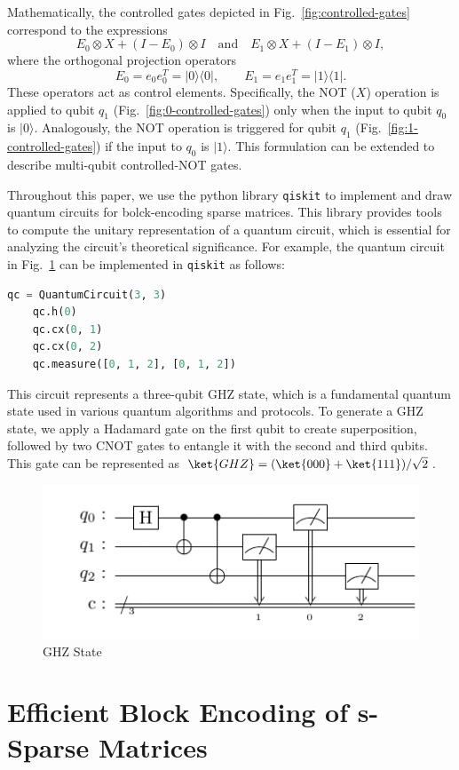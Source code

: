 \documentclass{article}
\begin{document}
    Mathematically, the controlled gates depicted in Fig.~\ref{fig:controlled-gates} correspond to the expressions
    $$
    E_0 \otimes X + (I - E_0) \otimes I \quad \text{and} \quad E_1 \otimes X + (I - E_1) \otimes I, \tag{2.3}
    $$
    where the orthogonal projection operators
    $$
    E_0 = e_0 e_0^T = |0\rangle\langle 0|, \qquad E_1 = e_1 e_1^T = |1\rangle\langle 1|. \tag{2.4}
    $$
    These operators act as control elements.
    Specifically, the NOT ($X$) operation is applied to qubit $q_1$ (Fig.~\ref{fig:0-controlled-gates}) only when the input to qubit $q_0$ is $|0\rangle$. Analogously, the NOT operation is triggered for qubit $q_1$ (Fig.~\ref{fig:1-controlled-gates}) if the input to $q_0$ is $|1\rangle$.
    This formulation can be extended to describe multi-qubit controlled-NOT gates.

    Throughout this paper, we use the python library \texttt{qiskit} \cite{wille2019ibm} to implement and draw quantum circuits for bolck-encoding sparse matrices.
    This library provides tools to compute the unitary representation of a quantum circuit, which is essential for analyzing the circuit's theoretical significance.
    For example, the quantum circuit in Fig.~\ref{fig:circuit1} can be implemented in \texttt{qiskit} as follows:
    \begin{lstlisting}[language=Python, label={lst:ghz-circuit}]
    qc = QuantumCircuit(3, 3)
    qc.h(0)
    qc.cx(0, 1)
    qc.cx(0, 2)
    qc.measure([0, 1, 2], [0, 1, 2])
    \end{lstlisting}
    This circuit represents a three-qubit GHZ state, which is a fundamental quantum state used in various quantum algorithms and protocols.
    To generate a GHZ state, we apply a Hadamard gate on the first qubit to create superposition, followed by two CNOT gates to entangle it with the second and third qubits.
    This gate can be represented as $\ket{GHZ} = (\ket{000}+\ket{111})/\sqrt{2}$.

    \begin{figure}[htbp]
        \centering
        \includegraphics[h]{pdf/example}
        \caption{
            GHZ State
        }
        \label{fig:circuit1}
    \end{figure}


    \section{Efficient Block Encoding of s-Sparse Matrices}



    
    
\end{document}
